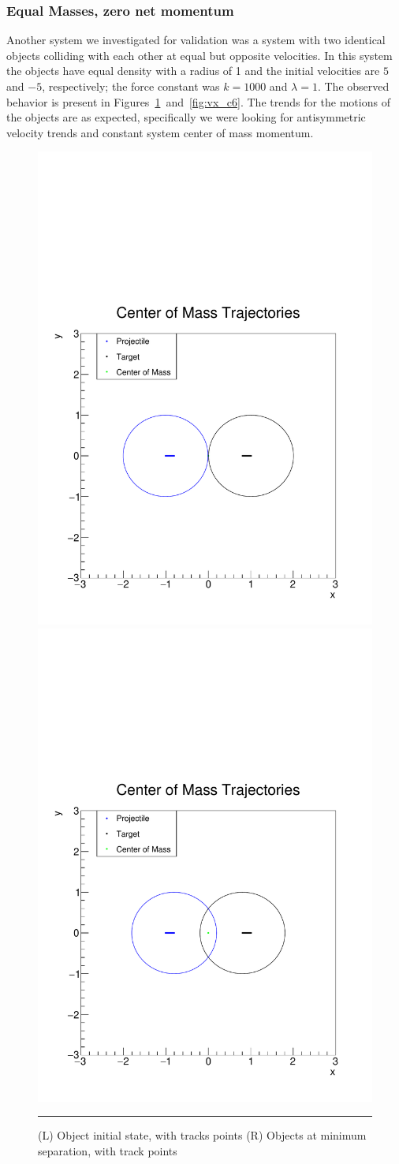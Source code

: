\documentclass[aps,prl,floatfix,preprint,nofootinbib]{revtex4}
\begin{document}
\subsubsection{Equal Masses, zero net momentum}
Another system we investigated for validation was a system with two identical objects colliding with each other at equal but opposite velocities. In this system the objects have equal density with a radius of 1 and the initial velocities are $5$ and $-5$, respectively; the force constant was $k = 1000$ and $\lambda = 1$. The observed behavior is present in Figures~\ref{fig:tracks_c6}~and~\ref{fig:vx_c6}. The trends for the motions of the objects are as expected, specifically we were looking for antisymmetric velocity trends and constant system center of mass momentum.
\begin{figure}[h!]
  \includegraphics[width=.45\textwidth]{plots/out_c6/x_vs_y_with_ellipse.pdf}
  \includegraphics[width=.45\textwidth]{plots/out_c6/x_vs_y_with_ellipse_MS.pdf}
                  {\par\nobreak\rule[9pt]{35em}{0.5pt}\vspace{-5mm}}
                  \caption{(L) Object initial state, with tracks points (R) Objects at minimum separation, with track points}
                  \label{fig:tracks_c6}
\end{figure}
\end{document}
